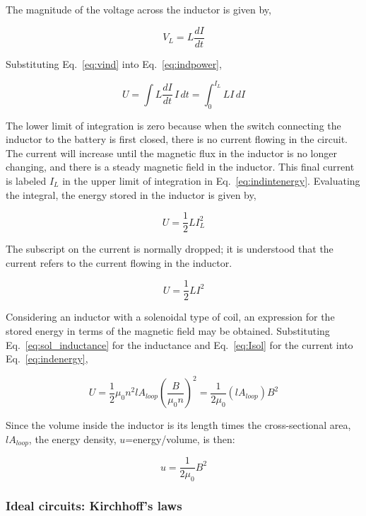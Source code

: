 \documentclass[12pt]{article}
\begin{document}
\begin{flushleft}
The magnitude of the voltage across the inductor is given by,

\begin{equation}
V_{L} = L\frac{dI}{dt}
\label{eq:vind}
\end{equation}

Substituting Eq.~\ref{eq:vind} into Eq.~\ref{eq:indpower},

\begin{equation}
U = \int L\frac{dI}{dt}\,I\,dt = \int_{0}^{I_{L}} LI \,dI
\label{eq:indintenergy}
\end{equation}

The lower limit of integration is zero because when the switch connecting the inductor to the battery is first closed, there is no current flowing in the circuit.  The current will increase until the magnetic flux in the inductor is no longer changing, and there is a steady magnetic field in the inductor.  This final current is labeled $I_{L}$ in the upper limit of integration in Eq.~\ref{eq:indintenergy}.  Evaluating the integral, the energy stored in the inductor is given by,

\[
U = \frac{1}{2}LI_{L}^{2}
\]

The subscript on the current is normally dropped; it is understood that the current refers to the current flowing in the inductor.

\begin{equation}
U = \frac{1}{2}LI^{2}
\label{eq:indenergy}
\end{equation}

Considering an inductor with a solenoidal type of coil, an expression for the stored energy in terms of the magnetic field may be obtained.  Substituting  Eq.~\ref{eq:sol_inductance} for the inductance and Eq.~\ref{eq:Isol} for the current into Eq.~\ref{eq:indenergy},

\[
U =  \frac{1}{2}\mu_{0}n^{2}\mathit{l}A_{loop} \left( \frac{B}{\mu_{0}n} \right)^{2} = \frac{1}{2\mu_{0}}\left( \mathit{l}A_{loop} \right) B^{2}
\]

Since the volume inside the inductor is its length times the cross-sectional area, $\mathit{l}A_{loop}$, the energy density, $u$=energy/volume, is then:

\[
u =  \frac{1}{2\mu_{0}} B^{2} 
\]

\subsubsection*{\bf Ideal circuits: Kirchhoff's laws}


\end{flushleft}
\end{document}
